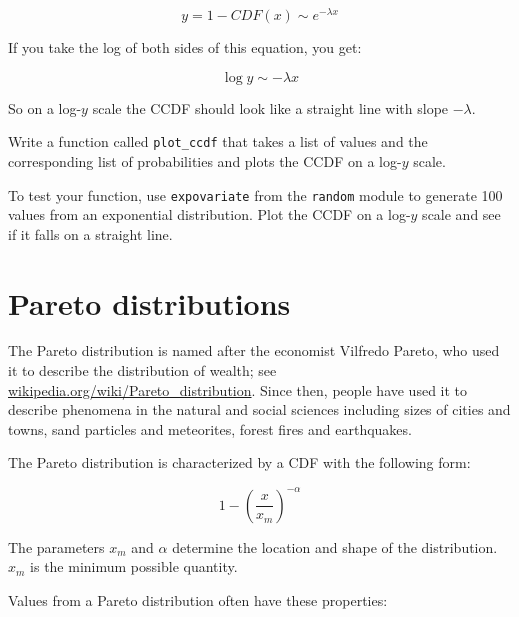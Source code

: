 \documentclass[10pt]{book}
\begin{document}
\[ y = 1 - CDF(x) \sim e^{-\lambda x} \]

If you take the log of both sides of this equation, you get:

\[ \log y \sim -\lambda x \]

So on a log-$y$ scale the CCDF should look like a straight line
with slope $-\lambda$.

\begin{ex}

Write a function called \verb"plot_ccdf" that takes
a list of values and the corresponding list of probabilities
and plots the CCDF on a log-$y$ scale.

To test your function, use {\tt expovariate} from the {\tt random}
module to generate 100 values from an exponential distribution.  Plot
the CCDF on a log-$y$ scale and see if it falls on a straight line.

\end{ex}


\section{Pareto distributions}

The Pareto distribution is named after the economist Vilfredo
Pareto, who used it to describe the distribution of wealth;
see \url{wikipedia.org/wiki/Pareto_distribution}.  Since then,
people have used it to describe
phenomena in the natural and social sciences
including sizes of cities and towns, sand particles
and meteorites, forest fires and earthquakes.

The Pareto distribution is characterized by a CDF with the following
form:

\[ 1- \left( \frac{x}{x_m} \right) ^{-\alpha} \]

The parameters $x_m$ and $\alpha$ determine the location and shape of
the distribution.  $x_m$ is the minimum possible quantity.

Values from a Pareto distribution often have these properties:
\end{document}
